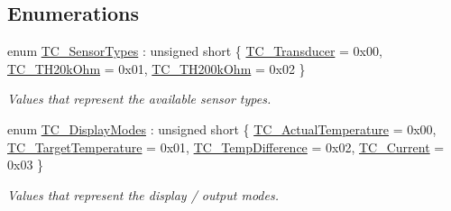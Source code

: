 \subsection*{Enumerations}
\begin{DoxyCompactItemize}
\item 
enum \hyperlink{group___t_cube_t_e_c_ga09ad866cf15d6a6eb83d02fd77606469}{T\+C\+\_\+\+Sensor\+Types} \+: unsigned short \{ \hyperlink{group___t_cube_t_e_c_gga09ad866cf15d6a6eb83d02fd77606469a5d0b232bd22bc87c69f72217e8a5a7e1}{T\+C\+\_\+\+Transducer} = 0x00, 
\hyperlink{group___t_cube_t_e_c_gga09ad866cf15d6a6eb83d02fd77606469a2c705d815f6576ea1bb445a516baeb09}{T\+C\+\_\+\+T\+H20k\+Ohm} = 0x01, 
\hyperlink{group___t_cube_t_e_c_gga09ad866cf15d6a6eb83d02fd77606469a9d3b8762b3bac030717e1826cb3dd9f2}{T\+C\+\_\+\+T\+H200k\+Ohm} = 0x02
 \}\begin{DoxyCompactList}\small\item\em Values that represent the available sensor types. \end{DoxyCompactList}
\item 
enum \hyperlink{group___t_cube_t_e_c_ga7651aeacb4e7e5a56465439d31bd547b}{T\+C\+\_\+\+Display\+Modes} \+: unsigned short \{ \hyperlink{group___t_cube_t_e_c_gga7651aeacb4e7e5a56465439d31bd547ba8d81f013003f5f4db22c3e370f7d1c2b}{T\+C\+\_\+\+Actual\+Temperature} = 0x00, 
\hyperlink{group___t_cube_t_e_c_gga7651aeacb4e7e5a56465439d31bd547ba27a8788a79e71f1b117676cbce077fb7}{T\+C\+\_\+\+Target\+Temperature} = 0x01, 
\hyperlink{group___t_cube_t_e_c_gga7651aeacb4e7e5a56465439d31bd547bafb392193128c492fcc202d8257a70432}{T\+C\+\_\+\+Temp\+Difference} = 0x02, 
\hyperlink{group___t_cube_t_e_c_gga7651aeacb4e7e5a56465439d31bd547bac761043437751efe54e0641cf298dacb}{T\+C\+\_\+\+Current} = 0x03
 \}\begin{DoxyCompactList}\small\item\em Values that represent the display / output modes. \end{DoxyCompactList}
\end{DoxyCompactItemize}
